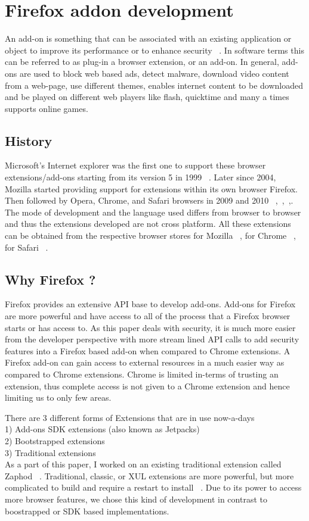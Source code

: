 \chapter{Firefox addon development} 
An add-on is something that can be associated with an existing application or object to improve its performance or to enhance security ~\cite{addon}. In software terms this can be referred to as plug-in a browser extension, or an add-on. In general, add-ons are used to block web based ads, detect malware, download video content from a web-page, use different themes, enables internet content to be downloaded and be played on different web players like flash, quicktime and many a times supports online games.

\section{History}
Microsoft's Internet explorer was the first one to support these browser extensions/add-ons starting from its version 5 in 1999 ~\cite{ie5}. Later since 2004, ~\cite{firefox} Mozilla started providing support for extensions within its own browser Firefox. Then followed by Opera, Chrome, and Safari browsers in 2009 and 2010 ~\cite{opera},~\cite{chrome},~\cite{safari},. The mode of development and the language used differs from browser to browser and thus the extensions developed are not cross platform. All these extensions can be obtained from the respective browser stores for Mozilla ~\cite{MExtension}, for Chrome ~\cite{CExtension}, for Safari ~\cite{SExtension}. 


\section{Why Firefox ?}
Firefox provides an extensive API base to develop add-ons. Add-ons for Firefox are more powerful and have access to all of the process that a Firefox browser starts or has access to. As this paper deals with security, it is much more easier from the developer perspective with more stream lined API calls to add security features into a Firefox based add-on when compared to Chrome extensions. A Firefox add-on can gain access to external resources in a much easier way as compared to Chrome extensions. Chrome is limited in-terms of trusting an extension, thus complete access is not given to a Chrome extension and hence limiting us to only few areas.	

There are 3 different forms of Extensions that are in use now-a-days ~\cite{FirefoxExtension}\\
1) Add-ons SDK extensions (also known as Jetpacks)\\
2) Bootstrapped extensions \\
3) Traditional extensions \\
As a part of this paper, I worked on an existing traditional extension called Zaphod ~\cite{Zaphod}. Traditional, classic, or XUL extensions are more powerful, but more complicated to build and require a restart to install ~\cite{FirefoxExtensionBuilding}. Due to its power to access more browser features, we chose this kind of development in contrast to boostrapped or SDK based implementations.
